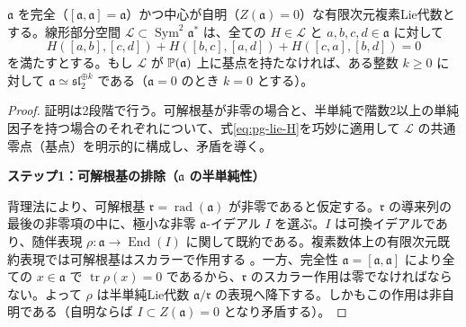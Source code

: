\begin{lemma}[基点自由性によるLie代数の制約]
\label{lem:pg-basepoint-free-lie}
$\mathfrak a$ を完全（$[\mathfrak a,\mathfrak a]=\mathfrak a$）かつ中心が自明（$Z(\mathfrak a)=0$）な有限次元複素Lie代数とする。線形部分空間 $\mathcal L\subset\operatorname{Sym}^2\mathfrak a^*$ は、全ての $H\in\mathcal L$ と $a,b,c,d\in\mathfrak a$ に対して
\begin{equation}
H([a,b],[c,d])+H([b,c],[a,d])+H([c,a],[b,d])=0
\label{eq:pg-lie-H}
\end{equation}
を満たすとする。もし $\mathcal L$ が $\mathbb P(\mathfrak a)$ 上に基点を持たなければ、ある整数 $k\ge0$ に対して $\mathfrak a\simeq\mathfrak{sl}_2^{\oplus k}$ である（$\mathfrak a=0$ のとき $k=0$ とする）。
\end{lemma}
\begin{proof}
証明は2段階で行う。可解根基が非零の場合と、半単純で階数2以上の単純因子を持つ場合のそれぞれについて、式\eqref{eq:pg-lie-H}を巧妙に適用して $\mathcal L$ の共通零点（基点）を明示的に構成し、矛盾を導く。

\par\medskip\noindent\textbf{ステップ1：可解根基の排除（$\mathfrak a$ の半単純性）}\par\nobreak\smallskip
背理法により、可解根基 $\mathfrak r=\operatorname{rad}(\mathfrak a)$ が非零であると仮定する。$\mathfrak r$ の導来列の最後の非零項の中に、極小な非零 $\mathfrak a$-イデアル $I$ を選ぶ。$I$ は可換イデアルであり、随伴表現 $\rho:\mathfrak a\to\operatorname{End}(I)$ に関して既約である。複素数体上の有限次元既約表現では可解根基はスカラーで作用する \cite[Proposition~16.9]{PEtingofLie}。一方、完全性 $\mathfrak a=[\mathfrak a,\mathfrak a]$ により全ての $x\in\mathfrak a$ で $\operatorname{tr}\rho(x)=0$ であるから、$\mathfrak r$ のスカラー作用は零でなければならない。よって $\rho$ は半単純Lie代数 $\mathfrak a/\mathfrak r$ の表現へ降下する。しかもこの作用は非自明である（自明ならば $I\subset Z(\mathfrak a)=0$ となり矛盾する）。


\end{proof}
